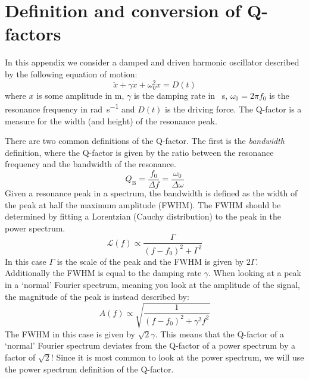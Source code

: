 \chapter{Definition and conversion of Q-factors}
\label{app:q_factors}

In this appendix we consider a damped and driven harmonic oscillator described by the following equation of motion:
\begin{equation}
    \ddot{x} + \gamma \dot{x} + \omega_0^2 x = D(t)
\end{equation}
where $x$ is some amplitude in \unit{\meter}, $\gamma$ is the damping rate in \unit{\per\second}, $\omega_0 = 2\pi f_0$ is the resonance frequency in \unit{\radian\per\second} and $D(t)$ is the driving force. The Q-factor is a measure for the width (and height) of the resonance peak.

There are two common definitions of the Q-factor. The first is the \textit{bandwidth} definition, where the Q-factor is given by the ratio between the resonance frequency and the bandwidth of the resonance.
\begin{equation}
    Q_\text{B} = \frac{f_0}{\Delta f} = \frac{\omega_0}{\Delta \omega}
\end{equation}
Given a resonance peak in a spectrum, the bandwidth is defined as the width of the peak at half the maximum amplitude (FWHM). The FWHM should be determined by fitting a Lorentzian (Cauchy distribution) to the peak in the power spectrum.
\begin{equation}
    \mathcal{L}(f) \propto \frac{\Gamma}{(f - f_0)^2 + \Gamma^2}
\end{equation}
In this case $\Gamma$ is the scale of the peak and the FWHM is given by $2\Gamma$. Additionally the FWHM is equal to the damping rate $\gamma$. When looking at a peak in a `normal' Fourier spectrum, meaning you look at the amplitude of the signal, the magnitude of the peak is instead described by:
\begin{equation}
    A(f) \propto \sqrt{\frac{1}{(f - f_0)^2 + \gamma^2f^2}}
\end{equation}
The FWHM in this case is given by $\sqrt{2}\gamma$. This means that the Q-factor of a `normal' Fourier spectrum deviates from the Q-factor of a power spectrum by a factor of $\sqrt{2}$! Since it is most common to look at the power spectrum, we will use the power spectrum definition of the Q-factor.

